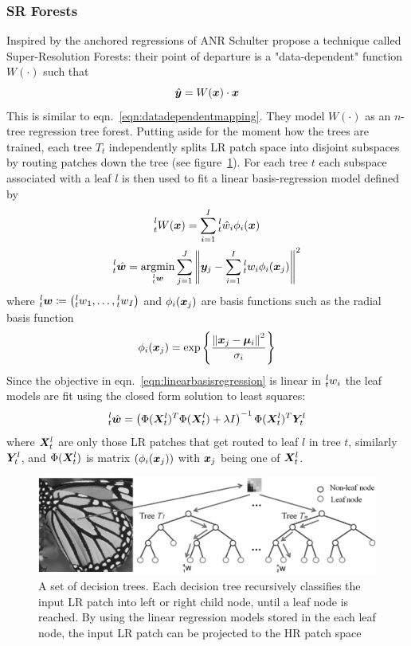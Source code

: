 \subsubsection{SR Forests}
Inspired by the anchored regressions of ANR Schulter \etal\cite{Schulter2015} propose a technique called Super-Resolution Forests: their point of departure is a "data-dependent" function $W(\cdot)$ such that
\begin{equation}
	\hat{\bm{y}} = W(\bm{x}) \cdot \bm{x}
\end{equation}
This is similar to eqn.~\eqref{eqn:datadependentmapping}.
%
They model $W(\cdot)$ as an $n$-tree regression tree forest.
%
Putting aside for the moment how the trees are trained, each tree $T_t$ independently splits LR patch space into disjoint subspaces by routing patches down the tree (see figure~\ref{fig:firf}).
%
For each tree $t$ each subspace associated with a leaf $l$ is then used to fit a linear basis-regression model defined by
\begin{gather}
	\prescript{l}{t}{W(\bx)} = \sum_{i=1}^I \prescript{l}{t}{\hat{w}_i}\phi_i(\bx) \\
	\prescript{l}{t}{\hat{\bm{w}}} = \underset{\prescript{l}{t}{\bm{w}}}{\text{argmin}} \sum_{j=1}^J \left\| \by_j - \sum_{i=1}^I \prescript{l}{t}{w_i}\phi_i(\bx_j) \right\|^2
	\label{eqn:linearbasisregression}
\end{gather}
where $\prescript{l}{t}{\bm{w}} \coloneqq \left( \prescript{l}{t}{w}_1, \mathellipsis, \prescript{l}{t}{w}_I \right)$ and $\phi_i(\bm{x}_j)$ are basis functions such as the radial basis function
\begin{equation}
	\phi_i(\bm{x}_j) = \exp \left\{ \frac{\left\| \bm{x}_j - \bm{\mu}_i \right\|^2}{\sigma_i} \right\}
\end{equation}
Since the objective in eqn.~\eqref{eqn:linearbasisregression} is linear in $\prescript{l}{t}{w}_i$ the leaf models are fit using the closed form solution to least squares:
\begin{equation}
	\prescript{l}{t}{\hat{\bm{w}}} = \left( \Phi(\bm{X}_t^l)^T \Phi(\bm{X}_t^l) + \lambda I \right)^{-1} \Phi(\bm{X}_t^l)^T \bm{Y}_t^l
\end{equation}
where $\bm{X}_t^l$ are only those LR patches that get routed to leaf $l$ in tree $t$, similarly $\bm{Y}_t^l$, and $\Phi(\bm{X}_t^l)$ is matrix $\left( \phi_i(\bm{x}_j) \right)$ with $\bm{x}_j$ being one of $\bm{X}_t^l$.
%
\begin{figure}
	\centering
	\includegraphics[width=\linewidth,keepaspectratio]{figures/classical/FIRF.png}
	\caption{A set of decision trees. Each decision tree recursively classifies the input LR patch into left or right child node, until a leaf node is reached. By using the linear regression models stored in the each leaf node, the input LR patch can be projected to the HR patch space\cite{Huang}}
	\label{fig:firf}
\end{figure}
